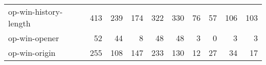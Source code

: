\begin{tabular}{lrrrrrrrrr}
     op-win-history-length &                              413 &                                239 &                                    174 &                          322 &                         330 &                                  76 &                                     57 &                           106 &                          103 \\
             op-win-opener &                               52 &                                 44 &                                      8 &                           48 &                          48 &                                   3 &                                      0 &                             3 &                            3 \\
             op-win-origin &                              255 &                                108 &                                    147 &                          233 &                         130 &                                  12 &                                     27 &                            34 &                           17 \\
\bottomrule
\end{tabular}
